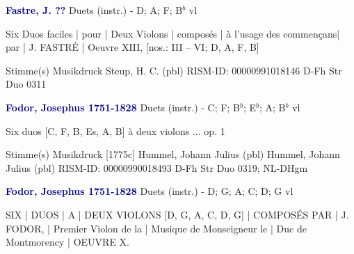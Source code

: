 \documentclass[twocolumn]{book}
\begin{document}
\newline \par \vspace{7pt} \textcolor{darkblue}{\textbf{Fastre, J.  ??}}
\newline Duets (instr.) - D; A; F; B$^b$
 vl
\newline \begin{itshape}Six Duos faciles | pour | Deux Violons | composés | à l'usage des commençans| par | J. FASTRÉ | Oeuvre XIII, [nos.: III – VI; D, A, F, B]\end{itshape} 
\newline \textcolor{darkblue}{}  Stimme(s)
\newline Musikdruck
\newline Steup, H. C.  (pbl)
\newline RISM-ID: 00000991018146
\newline D-Fh  Str Duo 0311
\newline \par \vspace{7pt} \textcolor{darkblue}{\textbf{Fodor, Josephus  1751-1828}}
\newline Duets (instr.) - C; F; B$^b$; E$^b$; A; B$^b$
 vl
\newline \begin{itshape}Six duos [C, F, B, Es, A, B] à deux violons ... op. 1\end{itshape} 
\newline \textcolor{darkblue}{}  Stimme(s)
\newline Musikdruck  [1775c]
\newline Hummel, Johann Julius  (pbl)
\newline Hummel, Johann Julius  (pbl)
\newline RISM-ID: 00000990018493
\newline D-Fh  Str Duo 0319; NL-DHgm
\newline \par \vspace{7pt} \textcolor{darkblue}{\textbf{Fodor, Josephus  1751-1828}}
\newline Duets (instr.) - D; G; A; C; D; G
 vl
\newline \begin{itshape}SIX | DUOS | A | DEUX VIOLONS [D, G, A, C, D, G] | COMPOSÉS PAR | J. FODOR, | Premier Violon de la | Musique de Monseigneur le | Duc de Montmorency | OEUVRE X.\end{itshape} 
\end{document}
